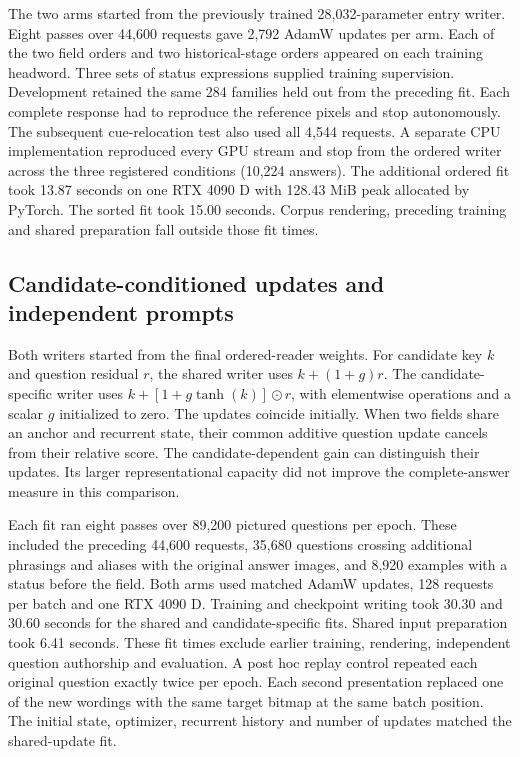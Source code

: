 \documentclass[12pt,a4paper]{article}
\providecommand{\DIFadd}[1]{{\protect\color{blue} \sf #1}} %
\begin{document}
\DIFadd{The two arms started from the previously trained 28,032-parameter entry writer. Eight passes over 44,600 requests gave 2,792 AdamW updates per arm. Each of the two field orders and two historical-stage orders appeared on each training headword. Three sets of status expressions supplied training supervision. Development retained the same 284 families held out from the preceding fit. Each complete response had to reproduce the reference pixels and stop autonomously. The subsequent cue-relocation test also used all 4,544 requests. A separate CPU implementation reproduced every GPU stream and stop from the ordered writer across the three registered conditions (10,224 answers). The additional ordered fit took 13.87 seconds on one RTX 4090 D with 128.43 MiB peak allocated by PyTorch. The sorted fit took 15.00 seconds. Corpus rendering, preceding training and shared preparation fall outside those fit times.
}

\subsection*{\DIFadd{Candidate-conditioned updates and independent prompts}}
\DIFadd{Both writers started from the final ordered-reader weights. For candidate key $k$ and question residual $r$, the shared writer uses $k+(1+g)r$. The candidate-specific writer uses $k+[1+g\tanh(k)]\odot r$, with elementwise operations and a scalar $g$ initialized to zero. The updates coincide initially. When two fields share an anchor and recurrent state, their common additive question update cancels from their relative score. The candidate-dependent gain can distinguish their updates. Its larger representational capacity did not improve the complete-answer measure in this comparison.
}

\DIFadd{Each fit ran eight passes over 89,200 pictured questions per epoch. These included the preceding 44,600 requests, 35,680 questions crossing additional phrasings and aliases with the original answer images, and 8,920 examples with a status before the field. Both arms used matched AdamW updates, 128 requests per batch and one RTX 4090 D. Training and checkpoint writing took 30.30 and 30.60 seconds for the shared and candidate-specific fits. Shared input preparation took 6.41 seconds. These fit times exclude earlier training, rendering, independent question authorship and evaluation. A post hoc replay control repeated each original question exactly twice per epoch. Each second presentation replaced one of the new wordings with the same target bitmap at the same batch position. The initial state, optimizer, recurrent history and number of updates matched the shared-update fit.
}
\end{document}
